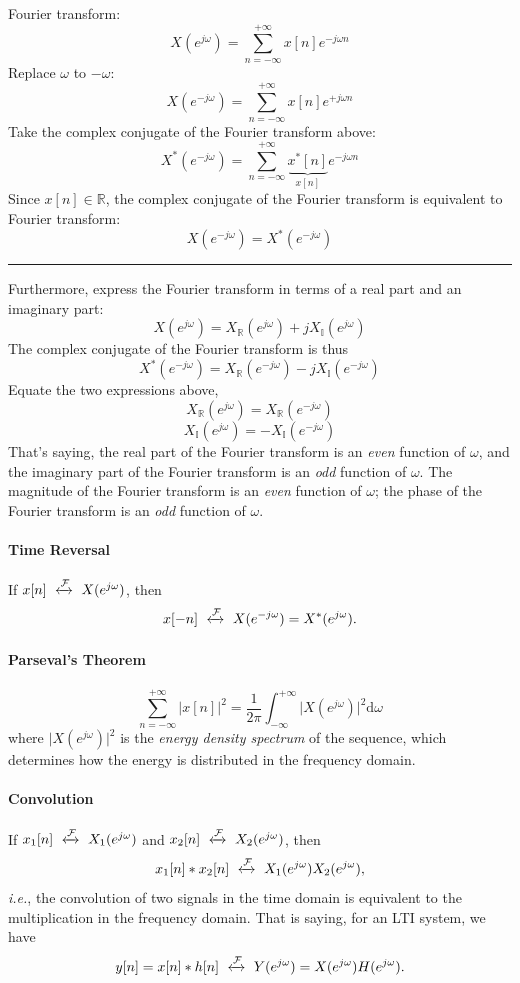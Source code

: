 \begin{dv}{}
Fourier transform:
\[
    X(e^{j\omega}) =  \sum_{n=-\infty}^{+\infty} x[n] e^{-j\omega n}
\]
Replace $\omega$ to $-\omega$:
\[
    X(e^{-j\omega}) =  \sum_{n=-\infty}^{+\infty} x[n] e^{+j\omega n}
\]
Take the complex conjugate of the Fourier transform above: 
\[
    X^{*}(e^{-j\omega}) =  \sum_{n=-\infty}^{+\infty} \underbrace{x^{*}[n]}_{x[n]} e^{-j\omega n}
\]
Since $x[n] \in \mathbb{R}$, the complex conjugate of the Fourier transform is equivalent to Fourier transform:
\[
    X(e^{-j\omega}) = X^{*}(e^{-j\omega})
\]
\rule{\textwidth}{.1ex}
Furthermore, express the Fourier transform in terms of a real part and an imaginary part:
\[
    X(e^{j\omega}) = X_{\mathbb{R}}(e^{j\omega}) + j X_{\mathbb{I}}(e^{j\omega})
\]
The complex conjugate of the Fourier transform is thus
\[
    X^{*}(e^{-j\omega}) = X_{\mathbb{R}}(e^{-j\omega}) - j X_{\mathbb{I}}(e^{-j\omega})
\]
Equate the two expressions above, 
\[
    X_{\mathbb{R}}(e^{j\omega}) = X_{\mathbb{R}}(e^{-j\omega})
\]
\[
    X_{\mathbb{I}}(e^{j\omega}) = -X_{\mathbb{I}}(e^{-j\omega})
\]
That's saying, the real part of the Fourier transform is an \textit{even} function of $\omega$, and the imaginary part of the Fourier transform is an \textit{odd} function of $\omega$.
The magnitude of the Fourier transform is an \textit{even} function of $\omega$; the phase of the Fourier transform is an \textit{odd} function of $\omega$.
\end{dv}

\paragraph{Time Reversal} If $x[n] \ \xleftrightarrow[]{\mathcal{F}} \ X(e^{j\omega})$, then
\[
    x[-n] \ \xleftrightarrow[]{\mathcal{F}} \  X(e^{-j\omega}) = X^*(e^{j \omega}).
\]


\paragraph{Parseval's Theorem}
\[
    \sum_{n=-\infty}^{+\infty} \lvert x[n] \rvert^2 =\frac{1}{2\pi} \int_{-\infty}^{+\infty} \lvert X(e^{j\omega}) \rvert^2 \mathrm{d}\omega 
\]
where $\lvert X(e^{j\omega}) \rvert^2$ is the \textit{energy density spectrum} of the sequence, which determines how the energy is distributed in the frequency domain.

\paragraph{Convolution} If $x_1[n] \ \xleftrightarrow[]{\mathcal{F}} \ X_1(e^{j\omega})$ and $x_2[n] \ \xleftrightarrow[]{\mathcal{F}} \ X_2(e^{j\omega})$, then 
\[
    x_1[n] * x_2[n] \ \xleftrightarrow[]{\mathcal{F}} \ X_1(e^{j\omega}) X_2(e^{j\omega}),
\]
\textit{i.e.}, the convolution of two signals in the time domain is equivalent to the multiplication in the frequency domain. That is saying, for an LTI system, we have 
\[
    y[n] = x[n] * h[n] \ \xleftrightarrow[]{\mathcal{F}} \  Y(e^{j\omega}) = X(e^{j\omega})H(e^{j\omega}).
\]
    

